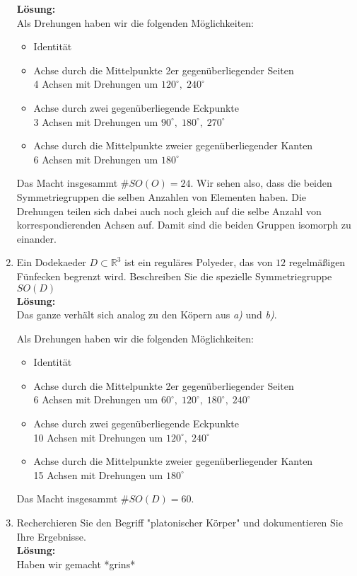 \documentclass[11pt,a4paper,ngerman]{article}
\newcommand{\R}{\mathbb{R}}
\begin{document}
\begin{enumerate}[\bfseries (a)]
\textbf{Lösung:}\\
Als Drehungen haben wir die folgenden Möglichkeiten:
\begin{itemize}
\item Identität
\item Achse durch die Mittelpunkte 2er gegenüberliegender Seiten\\
4 Achsen mit Drehungen um $120^\circ , \; 240^\circ$
\item Achse durch zwei gegenüberliegende Eckpunkte\\
3 Achsen mit Drehungen um $90^\circ , \; 180^\circ , \; 270^\circ$
\item Achse durch die Mittelpunkte zweier gegenüberliegender Kanten\\
6 Achsen mit Drehungen um $180^\circ$
\end{itemize}

Das Macht insgesammt $\# SO(O) = 24$. Wir sehen also, dass die beiden Symmetriegruppen die selben Anzahlen von Elementen haben. Die Drehungen teilen sich dabei auch noch gleich auf die selbe Anzahl von korrespondierenden Achsen auf. Damit sind die beiden Gruppen isomorph zu einander.

\item Ein Dodekaeder $D \subset \R ^3$ ist ein reguläres Polyeder, das von $12$ regelmäßigen Fünfecken begrenzt wird. Beschreiben Sie die spezielle Symmetriegruppe $SO(D)$\\

\textbf{Lösung:}\\
Das ganze verhält sich analog zu den Köpern aus \emph{a)} und \emph{b)}.

Als Drehungen haben wir die folgenden Möglichkeiten:
\begin{itemize}
\item Identität
\item Achse durch die Mittelpunkte 2er gegenüberliegender Seiten\\
6 Achsen mit Drehungen um $60^\circ , \; 120^\circ , \; 180^\circ , \; 240^\circ$
\item Achse durch zwei gegenüberliegende Eckpunkte\\
10 Achsen mit Drehungen um $120^\circ , \; 240^\circ $
\item Achse durch die Mittelpunkte zweier gegenüberliegender Kanten\\
15 Achsen mit Drehungen um $180^\circ$
\end{itemize}

Das Macht insgesammt $\# SO(D) = 60$. 

\item Recherchieren Sie den Begriff "platonischer Körper" {} und dokumentieren Sie Ihre Ergebnisse.\\

\textbf{Lösung:}\\
Haben wir gemacht *grins*
\end{enumerate}
\end{document}
